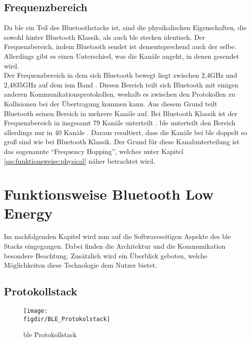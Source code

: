 \subsection{Frequenzbereich}
\label{ss:grundlagen:frequenz}

Da \ac{ble} ein Teil des Bluetoothstacks ist, sind die physikalischen Eigenschaften, die sowohl hinter Bluetooth Klassik, als auch \ac{ble} stecken identisch. Der Frequenzbereich, indem Bluetooth sendet ist dementsprechend auch der selbe. Allerdings gibt es einen Unterschied, was die Kanäle angeht, in denen gesendet wird.\\

\noindent Der Frequenzbereich in dem sich Bluetooth bewegt liegt zwischen 2,4GHz und 2,4835GHz auf dem \ac{ism} Band \cite[Seite 16]{Townsend14:GSB}. Diesen Bereich teilt sich Bluetooth mit einigen anderen Kommunikationsprotokollen, weshalb es zwischen den Protokollen zu Kollisionen bei der Übertragung kommen kann. Aus diesem Grund teilt Bluetooth seinen Bereich in mehrere Kanäle auf. Bei Bluetooth Klassik ist der Frequenzbereich in insgesamt 79 Kanäle unterteilt \cite[Seite 410]{Sauter18:GMK}. \ac{ble} unterteilt den Bereich allerdings nur in 40 Kanäle \cite[Seite 16]{Townsend14:GSB}. Daraus resultiert, dass die Kanäle bei \ac{ble} doppelt so groß sind wie bei Bluetooth Klassik. Der Grund für diese Kanalunterteilung ist das sogenannte "`Frequency Hopping"', welches unter Kapitel \ref{sss:funktionsweise:physical} näher betrachtet wird.\\  

\section{Funktionsweise Bluetooth Low Energy}
\label{s:funktionsweise}

Im nachfolgenden Kapitel wird nun auf die Softwareseitigen Aspekte des \ac{ble} Stacks eingegangen. Dabei finden die Architektur und die Kommunikation besondere Beachtung. Zusätzlich wird ein Überblick geboten, welche Möglichkeiten diese Technologie dem Nutzer bietet.\\  

\subsection{Protokollstack}
\label{ss:funktionsweise:protokollstack}

\begin{figure}[h]
	\centering
	\texttt{[image: \\figdir/BLE\_Protokolstack]}
	\caption{\ac{ble} Protokollstack \cite[Seite 16]{Townsend14:GSB}}
	\label{FIG:protokollstack}
\end{figure}

